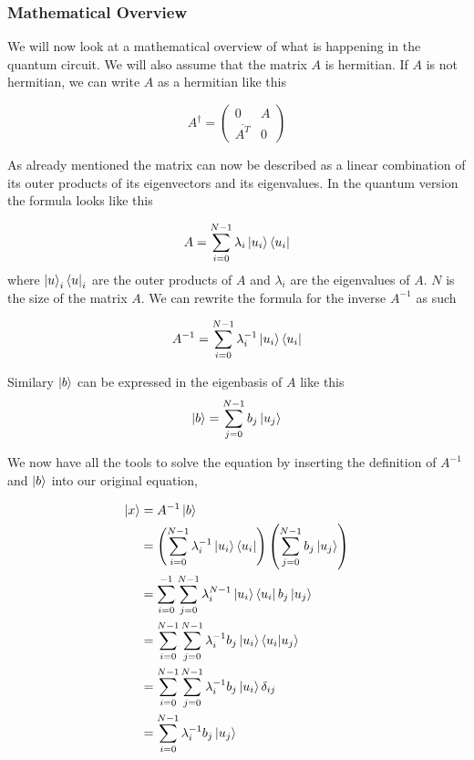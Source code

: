 \subsubsection{Mathematical Overview}
We will now look at a mathematical overview of what is happening in the quantum circuit.
We will also assume that the matrix $A$ is hermitian. If $A$ is not hermitian, we can write $A$ as a hermitian like this

\begin{equation}
A^\dagger = \begin{pmatrix} 0 & A \\ \overline{A^T}& 0 \end{pmatrix}
\end{equation}

As already mentioned the matrix can now be described as a linear combination of its outer products of its eigenvectors and its eigenvalues.
In the quantum version the formula looks like this

\begin{equation}
A = \sum_{i=0}^{N-1} \lambda_i \ket{u_i}\bra{u_i}
\end{equation}
where $\ket u_i  \bra u_i$ are the outer products of $A$ and $\lambda_i$ are the eigenvalues of $A$. 
$N$ is the size of the matrix $A$.
We can rewrite the formula for the inverse $A^{-1}$ as such

\begin{equation}
A^{-1} = \sum_{i=0}^{N-1} \lambda_i^{-1} \ket{u_i}\bra{u_i}
\end{equation}

Similary $\ket b$ can be expressed in the eigenbasis of $A$ like this
\begin{equation}
\ket{b} = \sum_{j=0}^{N-1} b_j\ket{u_j}
\end{equation}

We now have all the tools to solve the equation by inserting the definition of $A^{-1}$ and $\ket b$ into our original equation,

\begin{align*}
\ket{x} &= A^{-1} \ket{b}\\
&=\left(\sum_{i=0}^{N-1} \lambda_i^{-1} \ket{u_i}\bra{u_i} \right) \left(\sum_{j=0}^{N-1} b_j\ket{u_j} \right) \\
&=\sum_{i=0}^{-1} \sum_{j=0}^{N-1} \lambda_i^{N-1} \ket{u_i}\bra{u_i} b_j\ket{u_j}\\
&=\sum_{i=0}^{N-1} \sum_{j=0}^{N-1} \lambda_i^{-1} b_j\ket{u_i}\braket{u_i| u_j}\\
&=\sum_{i=0}^{N-1} \sum_{j=0}^{N-1} \lambda_i^{-1} b_j\ket{u_i}\delta_{ij}\\
&=\sum_{i=0}^{N-1} \lambda_i^{-1} b_j\ket{u_j}\\
\end{align*}

